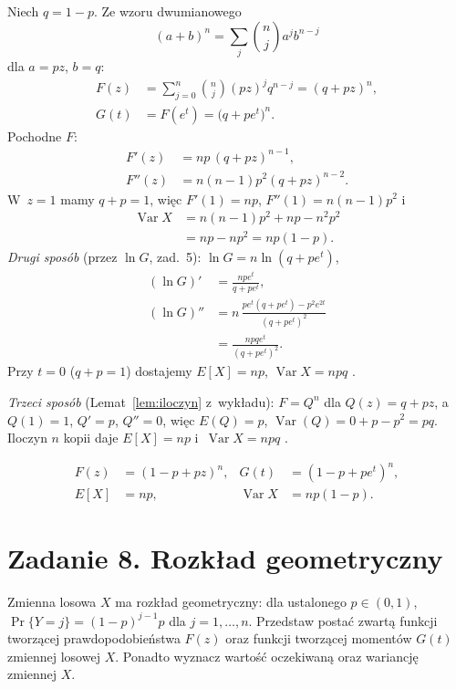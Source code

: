 \documentclass[11pt]{article}
\begin{document}
\formalnie
Niech $q=1-p$. Ze wzoru dwumianowego
\[(a+b)^n=\sum_j\binom nja^jb^{n-j}\]
dla $a=pz$, $b=q$:
\begin{align*}
F(z)&=\sum_{j=0}^n\binom nj(pz)^jq^{n-j}=(q+pz)^n,\\
G(t)&=F(e^t)=\bigl(q+pe^t\bigr)^n.
\end{align*}
Pochodne $F$:
\begin{align*}
F'(z)&=np\,(q+pz)^{n-1},\\
F''(z)&=n(n-1)p^2(q+pz)^{n-2}.
\end{align*}
W~$z=1$ mamy $q+p=1$, więc $F'(1)=np$, $F''(1)=n(n-1)p^2$ i
\begin{align*}
\operatorname{Var}X&=n(n-1)p^2+np-n^2p^2\\
&=np-np^2=np(1-p).
\end{align*}
\emph{Drugi sposób} (przez $\ln G$, zad.~5): $\ln G=n\ln(q+pe^t)$,
\begin{align*}
(\ln G)'&=\frac{npe^t}{q+pe^t},\\
(\ln G)''&=n\,\frac{pe^t(q+pe^t)-p^2e^{2t}}{(q+pe^t)^2}\\
&=\frac{npqe^t}{(q+pe^t)^2}.
\end{align*}
Przy $t=0$ ($q+p=1$) dostajemy $E[X]=np$, $\operatorname{Var}X=npq$ \checkmark.

\emph{Trzeci sposób} (Lemat~\ref{lem:iloczyn} z~wykładu): $F=Q^n$ dla
$Q(z)=q+pz$, a~$Q(1)=1$, $Q'=p$, $Q''=0$, więc $E(Q)=p$,
$\operatorname{Var}(Q)=0+p-p^2=pq$. Iloczyn $n$ kopii daje
$E[X]=np$ i~$\operatorname{Var}X=npq$ \checkmark.
\begin{odpowiedz}
\begin{align*}
F(z)&=(1-p+pz)^n,&
G(t)&=(1-p+pe^t)^n,\\
E[X]&=np,&
\operatorname{Var}X&=np(1-p).
\end{align*}
\end{odpowiedz}

\section{Zadanie 8. Rozkład geometryczny}
\begin{tresc}
Zmienna losowa $X$ ma rozkład geometryczny: dla ustalonego $p\in(0,1)$,
$\Pr\{Y=j\}=(1-p)^{j-1}p$ dla $j=1,\ldots,n$. Przedstaw postać zwartą
funkcji tworzącej prawdopodobieństwa $F(z)$ oraz funkcji tworzącej
momentów $G(t)$ zmiennej losowej $X$. Ponadto wyznacz wartość oczekiwaną
oraz wariancję zmiennej $X$.
\end{tresc}
\end{document}
